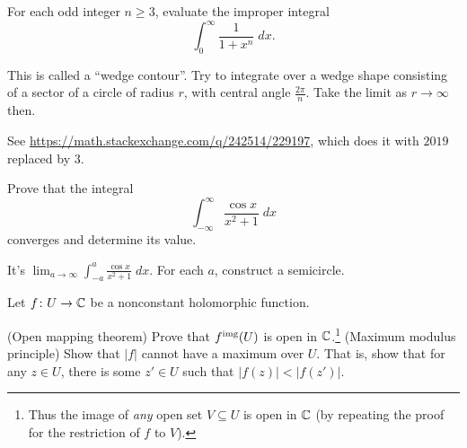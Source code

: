 \begin{problem}
	\gim
	For each odd integer $n \ge 3$, evaluate the improper integral
	\[ \int_0^\infty \frac{1}{1+x^{n}} \; dx. \]
	\begin{hint}
		This is called a ``wedge contour''.
		Try to integrate over a wedge shape
		consisting of a sector of a circle of radius $r$,
		with central angle $\frac{2\pi}{n}$.
		Take the limit as $r \to \infty$ then.
	\end{hint}
	\begin{sol}
		See \url{https://math.stackexchange.com/q/242514/229197},
		which does it with $2019$ replaced by $3$.
	\end{sol}
\end{problem}

\begin{problem}
	\yod
	Prove that the integral
	\[ \int_{-\infty}^{\infty} \frac{\cos x}{x^2+1} \; dx \]
	converges and determine its value.
	\begin{hint}
		It's $\lim_{a \to \infty} \int_{-a}^{a} \frac{\cos x}{x^2+1} \; dx$.
		For each $a$, construct a semicircle.
	\end{hint}
\end{problem}

\begin{sproblem}
	\gim
	Let $f \colon U \to \mathbb C$ be a nonconstant holomorphic function.
	\begin{enumerate}[(a)]
		\ii (Open mapping theorem)
		Prove that $f^{\text{img}}(U)$ is open in $\mathbb C$.\footnote{Thus
			the image of \emph{any}
			open set $V \subseteq U$ is open in $\mathbb C$
			(by repeating the proof for the restriction of $f$ to $V$).}
		\ii (Maximum modulus principle)
		Show that $\left\lvert f \right\rvert$
		cannot have a maximum over $U$.
		That is, show that for any $z \in U$,
		there is some $z' \in U$ such that
		$\left\lvert f(z) \right\rvert < \left\lvert f(z') \right\rvert$.
	\end{enumerate}
\end{sproblem}
